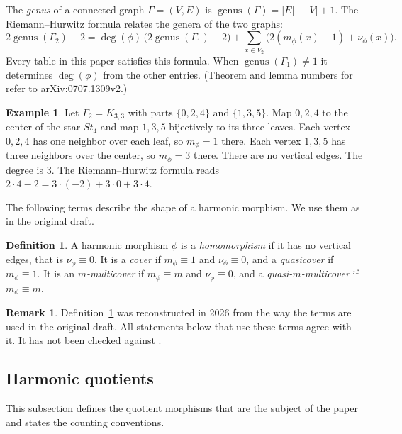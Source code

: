\documentclass[12pt,letterpaper]{article}
\theoremstyle{definition}
\newtheorem{definition}[theorem]{Definition}
\newtheorem{example}[theorem]{Example}
\newtheorem{revremark}{Remark}
\DeclareMathOperator{\genus}{genus}
\begin{document}
The {\it genus} of a connected graph $\Gamma=(V,E)$ is
$\genus(\Gamma)=|E|-|V|+1$. The Riemann--Hurwitz formula
\cite[Theorem~2.14]{BN09} relates the genera of the two graphs:
\[
2\genus(\Gamma_2)-2=\deg(\phi)\,\bigl(2\genus(\Gamma_1)-2\bigr)
+\sum_{x\in V_2}\bigl(2(m_\phi(x)-1)+\nu_\phi(x)\bigr).
\]
Every table in this paper satisfies this formula. When
$\genus(\Gamma_1)\neq 1$ it determines $\deg(\phi)$ from the other entries.
(Theorem and lemma numbers for \cite{BN09} refer to arXiv:0707.1309v2.)

\begin{example}
\label{example:rh-star}
Let $\Gamma_2=K_{3,3}$ with parts $\{0,2,4\}$ and $\{1,3,5\}$. Map $0,2,4$ to
the center of the star $St_4$ and map $1,3,5$ bijectively to its three
leaves. Each vertex $0,2,4$ has one neighbor over each leaf, so
$m_\phi=1$ there. Each vertex $1,3,5$ has three neighbors over the center,
so $m_\phi=3$ there. There are no vertical edges. The degree is $3$. The
Riemann--Hurwitz formula reads $2\cdot 4-2=3\cdot(-2)+3\cdot 0+3\cdot 4$.
\end{example}

The following terms describe the shape of a harmonic morphism. We use them
as in the original draft.

\begin{definition}
\label{def:covers}
A harmonic morphism $\phi$ is a {\it homomorphism} if it has no vertical
edges, that is $\nu_\phi\equiv 0$. It is a {\it cover} if $m_\phi\equiv 1$
and $\nu_\phi\equiv 0$, and a {\it quasicover} if $m_\phi\equiv 1$. It is an
{\it $m$-multicover} if $m_\phi\equiv m$ and $\nu_\phi\equiv 0$, and a
{\it quasi-$m$-multicover} if $m_\phi\equiv m$.
\end{definition}

\begin{revremark}
\label{rem:covers}
Definition~\ref{def:covers} was reconstructed in 2026 from the way the
terms are used in the original draft. All statements below that use these
terms agree with it. It has not been checked against \cite{MJ22}.
\end{revremark}

\subsection{Harmonic quotients}
\label{sec:quotients}

This subsection defines the quotient morphisms that are the subject of the
paper and states the counting conventions.
\end{document}
